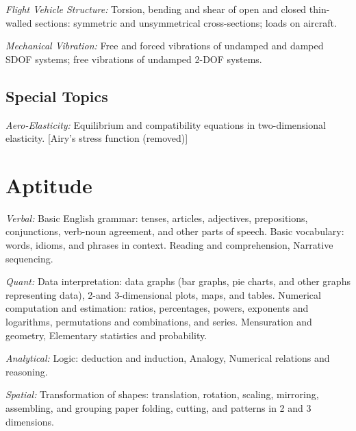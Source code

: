 \noindent\textit{Flight Vehicle Structure:} Torsion, bending and shear of open and closed thin-walled sections: symmetric and unsymmetrical cross-sections; loads on aircraft.

\noindent\textit{Mechanical Vibration:} Free and forced vibrations of undamped and damped SDOF systems; free vibrations of undamped 2-DOF systems.

\subsection{Special Topics}

\noindent \textit{Aero-Elasticity:} Equilibrium and compatibility equations in two-dimensional elasticity. [Airy's stress function (removed)]

\section{Aptitude}

\noindent\textit{Verbal:} Basic English grammar: tenses, articles, adjectives, prepositions, conjunctions, verb-noun agreement, and other parts of speech. Basic vocabulary: words, idioms, and phrases in context. Reading and comprehension, Narrative sequencing.

\noindent\textit{Quant:} Data interpretation: data graphs (bar graphs, pie charts, and other graphs representing data), 2-and 3-dimensional plots, maps, and tables. Numerical computation and estimation: ratios, percentages, powers, exponents and logarithms, permutations and combinations, and series. Mensuration and geometry, Elementary statistics and probability.

\noindent\textit{Analytical:} Logic: deduction and induction, Analogy, Numerical relations and reasoning.

\noindent\textit{Spatial:} Transformation of shapes: translation, rotation, scaling, mirroring, assembling, and grouping paper folding, cutting, and patterns in 2 and 3 dimensions.